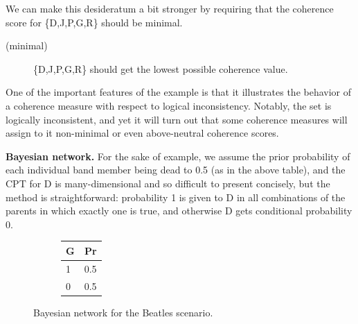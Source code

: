 \documentclass[
  10pt,
]{scrartcl}
\newcommand{\s}[1]{\textsf{#1}}
\begin{document}
We can make this desideratum a bit stronger by requiring that the coherence score for \{\s{D,J,P,G,R}\} should be minimal.
\vspace{2mm}

\begin{description}
    \item[(minimal)] \{\s{D,J,P,G,R}\} should get the lowest possible coherence value.
\end{description}\vspace{2mm}

One of the important features of the example is that it illustrates the behavior of a coherence measure with respect to logical inconsistency. Notably, the set is logically inconsistent, and yet it will turn out that some coherence measures will assign to it non-minimal or even above-neutral coherence scores.

\textbf{Bayesian network.} For the sake of example, we assume the prior probability of each individual band member being dead to 0.5 (as in the above table), and the CPT for \textsf{D} is many-dimensional and so difficult to present concisely, but the method is straightforward: probability 1 is given to \textsf{D} in all combinations of the parents in which exactly one is true, and otherwise \textsf{D} gets conditional probability 0.

\begin{figure}[H]
 \hfill
\begin{subfigure}[!ht]{0.2\textwidth}

\begin{tabular}{lr}
\toprule
G & Pr\\
\midrule
1 & 0.5\\
0 & 0.5\\
\bottomrule
\end{tabular}
\end{subfigure}
\caption{Bayesian network for the \textsf{Beatles} scenario.}
\end{figure}
\end{document}
